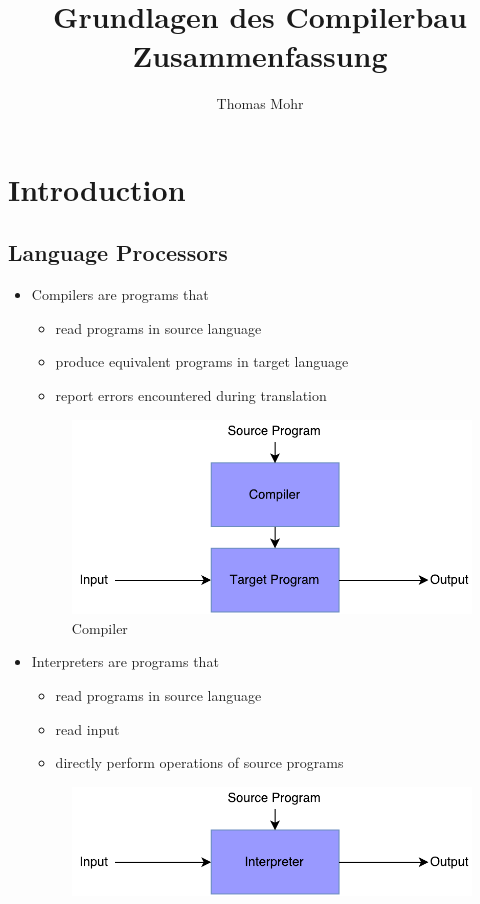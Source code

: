 \documentclass{scrartcl}
\title{Grundlagen des Compilerbau \\ Zusammenfassung}
\author{Thomas Mohr}
\date{}
\begin{document}
\maketitle
\pagebreak
\tableofcontents
\pagebreak

\section{Introduction}

\subsection{Language Processors}

\begin{itemize}
	\item Compilers are programs that
	\begin{itemize}
		\item read programs in source language
		\item produce equivalent programs in target language
		\item report errors encountered during translation
	\end{itemize}
	\begin{figure}[ht!]
		\centering
		\includegraphics[width=0.7\linewidth]{figures/compilers}
		\caption{Compiler}
		\label{fig:compilers}
	\end{figure}
	\item Interpreters are programs that
	\begin{itemize}
		\item read programs in source language
		\item read input
		\item directly perform operations of source programs
	\end{itemize}
	\begin{figure}[ht!]
		\centering
		\includegraphics[width=0.7\linewidth]{figures/interpreters}

\end{figure}
\end{itemize}
\end{document}
